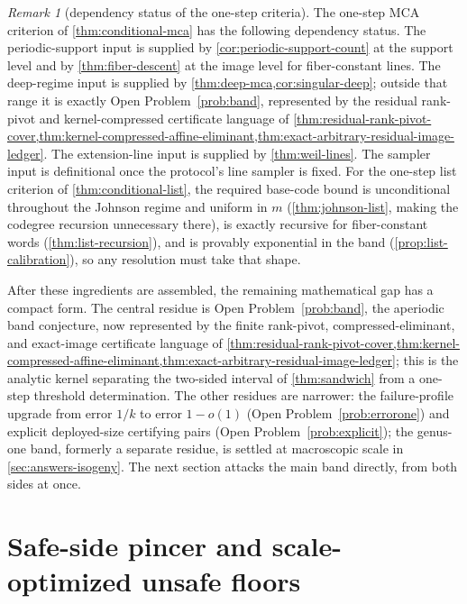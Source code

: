 \documentclass[11pt]{article}
\theoremstyle{definition}
\theoremstyle{remark}
\newtheorem{remark}[theorem]{Remark}
\begin{document}
\begin{remark}[dependency status of the one-step criteria]\label{rem:conditional-status}
The one-step MCA criterion of \cref{thm:conditional-mca} has the following dependency status.  The periodic-support input is supplied by \cref{cor:periodic-support-count} at the support level and by \cref{thm:fiber-descent} at the image level for fiber-constant lines.  The deep-regime input is supplied by \cref{thm:deep-mca,cor:singular-deep}; outside that range it is exactly Open Problem~\ref{prob:band}, represented by the residual rank-pivot and kernel-compressed certificate language of \cref{thm:residual-rank-pivot-cover,thm:kernel-compressed-affine-eliminant,thm:exact-arbitrary-residual-image-ledger}.  The extension-line input is supplied by \cref{thm:weil-lines}.  The sampler input is definitional once the protocol's line sampler is fixed.  For the one-step list criterion of \cref{thm:conditional-list}, the required base-code bound is unconditional throughout the Johnson regime and uniform in $m$ \textup(\cref{thm:johnson-list}, making the codegree recursion unnecessary there\textup), is exactly recursive for fiber-constant words \textup(\cref{thm:list-recursion}\textup), and is provably exponential in the band \textup(\cref{prop:list-calibration}\textup), so any resolution must take that shape.
\end{remark}

After these ingredients are assembled, the remaining mathematical gap has a compact form.  The central residue is Open Problem~\ref{prob:band}, the aperiodic band conjecture, now represented by the finite rank-pivot, compressed-eliminant, and exact-image certificate language of \cref{thm:residual-rank-pivot-cover,thm:kernel-compressed-affine-eliminant,thm:exact-arbitrary-residual-image-ledger}; this is the analytic kernel separating the two-sided interval of \cref{thm:sandwich} from a one-step threshold determination.  The other residues are narrower: the failure-profile upgrade from error $1/k$ to error $1-o(1)$ \textup(Open Problem~\ref{prob:errorone}\textup) and explicit deployed-size certifying pairs \textup(Open Problem~\ref{prob:explicit}\textup); the genus-one band, formerly a separate residue, is settled at macroscopic scale in \cref{sec:answers-isogeny}.  The next section attacks the main band directly, from both sides at once.

\section{Safe-side pincer and scale-optimized unsafe floors}\label{sec:pincer}
\end{document}
